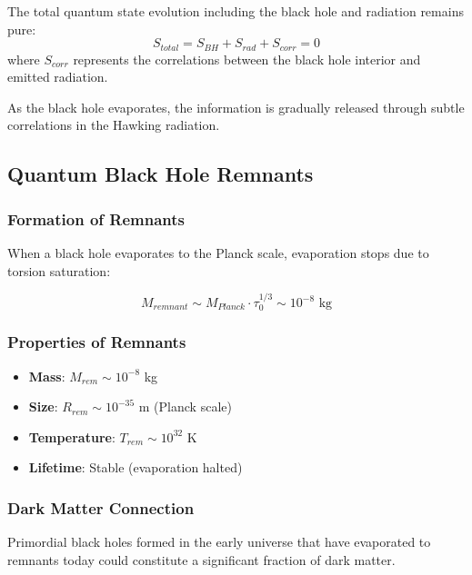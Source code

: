 \begin{theorem}
The total quantum state evolution including the black hole and radiation remains pure:
\begin{equation}
    S_{total} = S_{BH} + S_{rad} + S_{corr} = 0
\end{equation}
where $S_{corr}$ represents the correlations between the black hole interior and emitted radiation.
\end{theorem}

As the black hole evaporates, the information is gradually released through subtle correlations in the Hawking radiation.

\subsection{Quantum Black Hole Remnants}

\subsubsection{Formation of Remnants}

When a black hole evaporates to the Planck scale, evaporation stops due to torsion saturation:

\begin{equation}
    M_{remnant} \sim M_{Planck} \cdot \tau_0^{1/3} \sim 10^{-8} \text{ kg}
\end{equation}

\subsubsection{Properties of Remnants}

\begin{itemize}
    \item \textbf{Mass}: $M_{rem} \sim 10^{-8}$ kg
    \item \textbf{Size}: $R_{rem} \sim 10^{-35}$ m (Planck scale)
    \item \textbf{Temperature}: $T_{rem} \sim 10^{32}$ K
    \item \textbf{Lifetime}: Stable (evaporation halted)
\end{itemize}

\subsubsection{Dark Matter Connection}

\begin{proposition}
Primordial black holes formed in the early universe that have evaporated to remnants today could constitute a significant fraction of dark matter.
\end{proposition}

